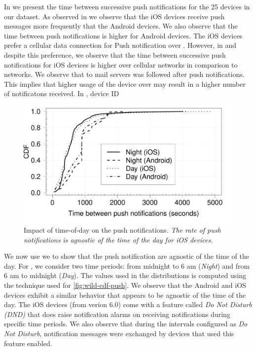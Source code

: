 In  we present the time between successive push notifications for the 25 devices in our dataset. 
As observed in  we observe that the iOS devices receive push messages more frequently that the Android devices. 
We also observe that the time between push notifications is higher for Android devices.
The iOS devices prefer a cellular data connection for Push notification over \wifi {}. 
However, in  and  despite this preference, we observe that the time between successive push notifications for iOS devices is higher over cellular networks in comparison to \wifi networks.  
We observe that  to mail servers was followed  after push notifications.
This implies that higher usage of the device over \wifi may result in a higher number of notificatons received. 
In , device ID 


\begin{figure}
\includegraphics[width=\columnwidth]{plots/cdf_night_push_comparison_device_wild.pdf}
\caption{Impact of time-of-day on the push notifications. \emph{The rate of push notifications is agnostic of the time of the day for iOS devices.}}
\label{fig:wild-cdf-push-night}
\end{figure}

We now use  we to show that the push notification are agnostic of the time of the day. 
For , we consider two time periods: from midnight to 6 am (\emph{Night}) and from 6 am to midnight (\emph{Day}).
The values used in the distributions is computed using the technique used for \ref{fig:wild-cdf-push}. 
We observe that the Android and iOS devices exhibit a similar behavior that appears to be agnostic of the time of the day. 
The iOS devices (from verion 6.0) come with a feature called \emph{Do Not Disturb (DND)} that does raise notification alarms on receiving notifications during specific time periods. 
We also observe that during the intervals configured as \emph{Do Not Disturb}, notification messages were exchanged by devices that used this feature enabled. 

